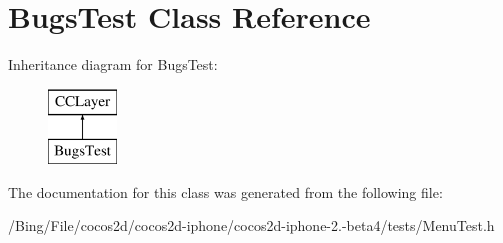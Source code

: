 \hypertarget{interface_bugs_test}{\section{Bugs\-Test Class Reference}
\label{interface_bugs_test}
}
Inheritance diagram for Bugs\-Test\-:\begin{figure}[H]
\begin{center}
\leavevmode
\includegraphics[height=2.000000cm]{interface_bugs_test}
\end{center}
\end{figure}


The documentation for this class was generated from the following file\-:\begin{DoxyCompactItemize}
\item 
/\-Bing/\-File/cocos2d/cocos2d-\/iphone/cocos2d-\/iphone-\/2.-\/beta4/tests/Menu\-Test.\-h\end{DoxyCompactItemize}
